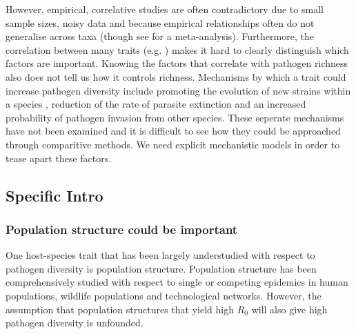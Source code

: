 However, empirical, correlative studies are often contradictory due to small sample sizes, noisy data and because empirical relationships often do not generalise across taxa (though see \cite{kamiya2014determines} for a meta-analysis).
Furthermore, the correlation between many traits (e.g. \cite{nunn2015infectious}) makes it hard to clearly distinguish which factors are important.
Knowing the factors that correlate with pathogen richness also does not tell us how it controls richness. 
Mechanisms by which a trait could increase pathogen diversity include promoting the evolution of new strains within a species \cite{buckee2004effects}, reduction of the rate of parasite extinction and an increased probability of pathogen invasion from other species.
These seperate mechanisms have not been examined and it is difficult to see how they could be approached through comparitive methods.
We need explicit mechanistic models in order to tease apart these factors.








\subsection{Specific Intro}


\subsubsection{Population structure could be important}
One host-species trait that has been largely understudied with respect to pathogen diversity is population structure.
Population structure has been comprehensively studied with respect to single or competing epidemics in human populations, wildlife populations and technological networks.
However, the assumption that population structures that yield high $R_0$ will also give high pathogen diversity \cite{nunn2003comparative} is unfounded.




